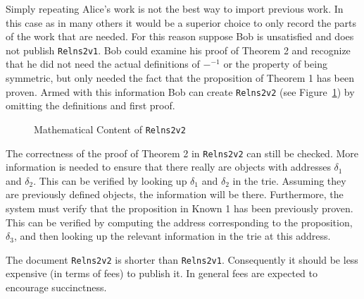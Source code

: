 \documentclass{article}
\begin{document}
Simply repeating Alice's work is not the best way to import previous work.
In this case as in many others it would be a superior choice to only record the
parts of the work that are needed.
For this reason suppose Bob is unsatisfied and does not publish {\tt{Relns2v1}}.
Bob could examine his proof of Theorem 2 and recognize that he did not
need the actual definitions of $-^{-1}$ or the property of being symmetric, but only needed
the fact that the proposition of Theorem 1 has been proven.
Armed with this information Bob can create {\tt{Relns2v2}} (see Figure~\ref{fig:docrelns2v2})
by omitting the definitions and first proof.

\begin{figure}
\begin{center}
\end{center}
\caption{Mathematical Content of {\tt{Relns2v2}}}
\label{fig:docrelns2v2}
\end{figure}

The correctness of the proof of Theorem 2 in {\tt{Relns2v2}} can still be checked.
More information is needed to ensure that there really are objects with addresses $\delta_1$
and $\delta_2$. This can be verified by looking up $\delta_1$ and $\delta_2$ in the trie.
Assuming they are previously defined objects, the information will be there.
Furthermore, the system must verify that the proposition in Known 1 has been previously proven.
This can be verified by computing the address corresponding to the proposition, $\delta_3$,
and then looking up the relevant information in the trie at this address.

The document {\tt{Relns2v2}} is shorter than {\tt{Relns2v1}}.
Consequently it should be less expensive (in terms of fees) to publish it.
In general fees are expected to encourage succinctness.
\end{document}
